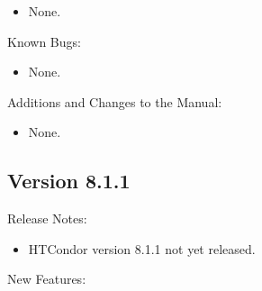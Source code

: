\begin{itemize}

\item None.

\end{itemize}

\noindent Known Bugs:

\begin{itemize}

\item None.

\end{itemize}

\noindent Additions and Changes to the Manual:

\begin{itemize}

\item None.

\end{itemize}


\subsection*{\label{sec:New-8-1-1}Version 8.1.1}

\noindent Release Notes:

\begin{itemize}

\item HTCondor version 8.1.1 not yet released.

\end{itemize}


\noindent New Features:


